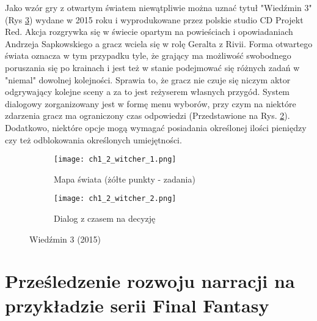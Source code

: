 \newpage

Jako wzór gry z otwartym światem niewątpliwie można uznać tytuł "Wiedźmin 3" (Rys \ref{fig:ch1_2_witcher})
wydane w 2015 roku i wyprodukowane przez polskie studio CD Projekt Red. Akcja rozgrywka się w świecie
opartym na powieściach i opowiadaniach Andrzeja Sapkowskiego a gracz wciela się w rolę Geralta z Rivii.
Forma otwartego świata oznacza w tym przypadku tyle, że grający ma możliwość swobodnego poruszania się
po krainach i jest też w stanie podejmować się różnych zadań w "niemal" dowolnej kolejności. Sprawia to, że
gracz nie czuje się niczym aktor odgrywający kolejne sceny a za to jest reżyserem własnych przygód.
System dialogowy zorganizowany jest w formę menu wyborów, przy czym na niektóre zdarzenia gracz ma
ograniczony czas odpowiedzi (Przedstawione na Rys. \ref{subfig:ch_1_2_witcher_2}). Dodatkowo, niektóre
opcje mogą wymagać posiadania określonej ilości pieniędzy czy też odblokowania określonych umiejętności.

\begin{figure}[h]
	\begin{subfigure}{0.49\textwidth}
		\caption{Mapa świata (żółte punkty - zadania)}
		\texttt{[image: ch1\_2\_witcher\_1.png]}
		\label{subfig:ch_1_2_witcher_1}
	\end{subfigure}
	\begin{subfigure}{0.49\textwidth}
		\caption{Dialog z czasem na decyzję}
		\texttt{[image: ch1\_2\_witcher\_2.png]}
		\label{subfig:ch_1_2_witcher_2}
	\end{subfigure}
	\caption{Wiedźmin 3 (2015)}
	\label{fig:ch1_2_witcher}
\end{figure}

\newpage

\section{Prześledzenie rozwoju narracji na przykładzie serii Final Fantasy}\label{subsection:ch1_3}


